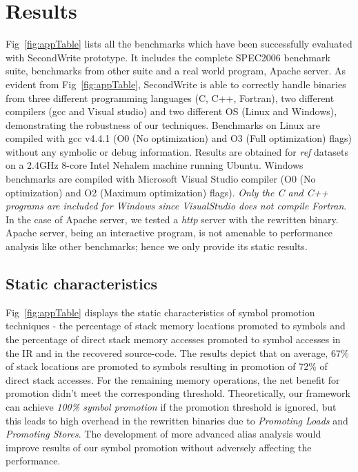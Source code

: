 \section{Results} 
\label{sec:results}
Fig~\ref{fig:appTable} lists all the benchmarks which have been successfully evaluated with SecondWrite prototype. It includes the complete SPEC2006 benchmark suite, benchmarks from other suite and a real world program, Apache server. As evident from Fig~\ref{fig:appTable}, SecondWrite is able to correctly handle binaries from three different programming languages (C, C++, Fortran), two different compilers (gcc and Visual studio) and two different OS (Linux and Windows), demonstrating the robustness of our techniques. Benchmarks on Linux are compiled with gcc v4.4.1 (O0 (No optimization) and O3 (Full optimization) flags) without any symbolic or debug information. Results are obtained for \emph{ref} datasets
on a 2.4GHz 8-core Intel Nehalem machine running Ubuntu. Windows benchmarks are compiled with Microsoft Visual Studio compiler (O0 (No optimization) and O2 (Maximum optimization) flags). \emph{Only the C and C++ programs are included for Windows since VisualStudio does not compile Fortran}. In the case of Apache server, we tested a \emph{http} server with the rewritten binary. Apache server, being an interactive program, is not amenable to performance analysis like other benchmarks; hence we only provide its static results.
 

%
\subsection{Static characteristics}
Fig~\ref{fig:appTable} displays the static characteristics of symbol promotion techniques - the percentage of stack memory locations promoted to symbols and the percentage of direct stack memory accesses promoted to symbol accesses in the IR and in the recovered source-code. The results depict that on average, 67\% of stack locations are promoted to symbols resulting in promotion of 72\% of direct stack accesses. For the remaining memory operations, the net benefit for promotion didn't meet the corresponding threshold. Theoretically, our framework can achieve \emph{100\% symbol promotion} if the promotion threshold is ignored, but this leads to high overhead in the rewritten binaries due to \emph{Promoting Loads} and \emph{Promoting Stores}. The development of more advanced alias analysis would improve results of our symbol promotion without adversely affecting the performance.

